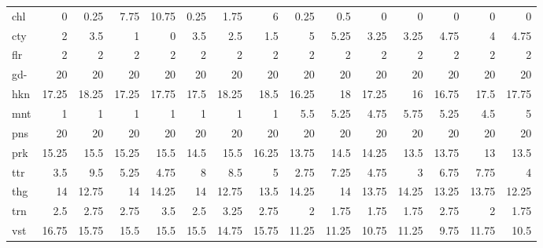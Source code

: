 \begin{center}
\begin{tabular}{lrrrrrrrrrrrrrr}
chl & 0 & 0.25 & 7.75 & 10.75 & 0.25 & 1.75 & 6 & 0.25 & 0.5 & 0 & 0 & 0 & 0 & 0\\
cty & 2 & 3.5 & 1 & 0 & 3.5 & 2.5 & 1.5 & 5 & 5.25 & 3.25 & 3.25 & 4.75 & 4 & 4.75\\
flr & 2 & 2 & 2 & 2 & 2 & 2 & 2 & 2 & 2 & 2 & 2 & 2 & 2 & 2\\
gd- & 20 & 20 & 20 & 20 & 20 & 20 & 20 & 20 & 20 & 20 & 20 & 20 & 20 & 20\\
hkn & 17.25 & 18.25 & 17.25 & 17.75 & 17.5 & 18.25 & 18.5 & 16.25 & 18 & 17.25 & 16 & 16.75 & 17.5 & 17.75\\
mnt & 1 & 1 & 1 & 1 & 1 & 1 & 1 & 5.5 & 5.25 & 4.75 & 5.75 & 5.25 & 4.5 & 5\\
pns & 20 & 20 & 20 & 20 & 20 & 20 & 20 & 20 & 20 & 20 & 20 & 20 & 20 & 20\\
prk & 15.25 & 15.5 & 15.25 & 15.5 & 14.5 & 15.5 & 16.25 & 13.75 & 14.5 & 14.25 & 13.5 & 13.75 & 13 & 13.5\\
ttr & 3.5 & 9.5 & 5.25 & 4.75 & 8 & 8.5 & 5 & 2.75 & 7.25 & 4.75 & 3 & 6.75 & 7.75 & 4\\
thg & 14 & 12.75 & 14 & 14.25 & 14 & 12.75 & 13.5 & 14.25 & 14 & 13.75 & 14.25 & 13.25 & 13.75 & 12.25\\
trn & 2.5 & 2.75 & 2.75 & 3.5 & 2.5 & 3.25 & 2.75 & 2 & 1.75 & 1.75 & 1.75 & 2.75 & 2 & 1.75\\
vst & 16.75 & 15.75 & 15.5 & 15.5 & 15.5 & 14.75 & 15.75 & 11.25 & 11.25 & 10.75 & 11.25 & 9.75 & 11.75 & 10.5\\
\end{tabular}
\end{center}


